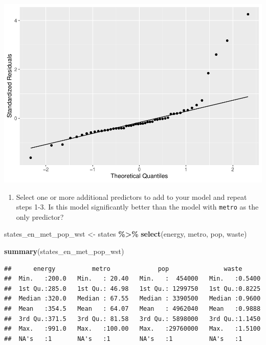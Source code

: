 \documentclass[
]{book}
\newenvironment{Shaded}{\begin{snugshade}}{\end{snugshade}}
\newcommand{\KeywordTok}[1]{\textcolor[rgb]{0.13,0.29,0.53}{\textbf{#1}}}
\newcommand{\NormalTok}[1]{#1}
\newcommand{\OperatorTok}[1]{\textcolor[rgb]{0.81,0.36,0.00}{\textbf{#1}}}
\newcommand{\StringTok}[1]{\textcolor[rgb]{0.31,0.60,0.02}{#1}}
\providecommand{\tightlist}{%
  \setlength{\itemsep}{0pt}\setlength{\parskip}{0pt}}
\begin{document}
\begin{alert}
\includegraphics{R/Rmodels/figures/unnamed-chunk-102-2.pdf}

\begin{enumerate}
\def\labelenumi{\arabic{enumi}.}
\setcounter{enumi}{3}
\tightlist
\item
  Select one or more additional predictors to add to your model and repeat steps 1-3. Is this model significantly better than the model with \texttt{metro} as the only predictor?
\end{enumerate}

\begin{Shaded}
\begin{Highlighting}[]
\NormalTok{  states\_en\_met\_pop\_wst \textless{}{-}}\StringTok{ }
\StringTok{      }\NormalTok{states }\OperatorTok{\%\textgreater{}\%}
\StringTok{      }\KeywordTok{select}\NormalTok{(energy, metro, pop, waste)}

  \KeywordTok{summary}\NormalTok{(states\_en\_met\_pop\_wst)}
\end{Highlighting}
\end{Shaded}

\begin{verbatim}
##      energy          metro             pop               waste       
##  Min.   :200.0   Min.   : 20.40   Min.   :  454000   Min.   :0.5400  
##  1st Qu.:285.0   1st Qu.: 46.98   1st Qu.: 1299750   1st Qu.:0.8225  
##  Median :320.0   Median : 67.55   Median : 3390500   Median :0.9600  
##  Mean   :354.5   Mean   : 64.07   Mean   : 4962040   Mean   :0.9888  
##  3rd Qu.:371.5   3rd Qu.: 81.58   3rd Qu.: 5898000   3rd Qu.:1.1450  
##  Max.   :991.0   Max.   :100.00   Max.   :29760000   Max.   :1.5100  
##  NA's   :1       NA's   :1        NA's   :1          NA's   :1
\end{verbatim}


\end{alert}
\end{document}
